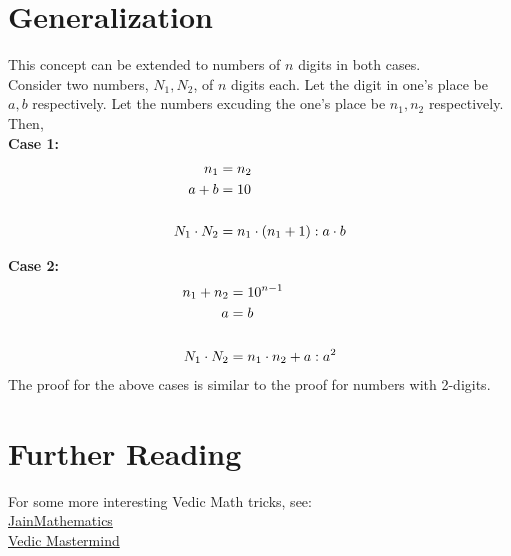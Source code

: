 \documentclass{article}
\begin{document}
\newpage
\section*{Generalization}

This concept can be extended to numbers of $n$ digits in both cases.\\
Consider two numbers, $N_1,N_2$, of $n$ digits each. Let the digit in one's place be $a,b$ respectively. Let the numbers excuding the one's place be $n_1,n_2$ respectively.\\
Then,\\

\textbf{Case 1:}
\begin{gather}\notag
\begin{aligned}
    n_1 &=n_2\\
a+b &=10\\
    \\
N_1\cdot N_2 &=n_1\cdot (n_1+1):a\cdot b
\end{aligned}
\end{gather}

\textbf{Case 2:}
\begin{gather}\notag
\begin{aligned}
n_1+n_2 &=10^{n-1}\\
    a &=b\\
    \\
N_1\cdot N_2 &=n_1\cdot n_2+a:a^2
\end{aligned}
\end{gather}
The proof for the above cases is similar to the proof for numbers with 2-digits.

\section{Further Reading}
For some more interesting Vedic Math tricks, see:\\
\href{http://www.jainmathemagics.com/vedicmathematics/}{JainMathematics}\\
\href{http://www.mastermindvedicmaths.com/}{Vedic Mastermind}%


\printbibliography
\end{document}
